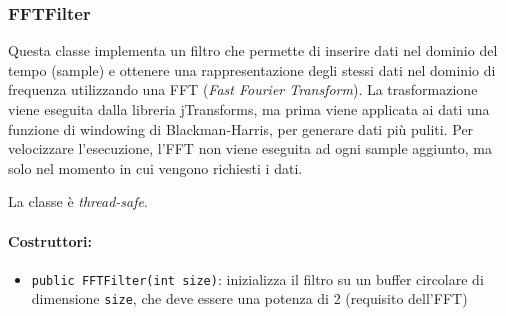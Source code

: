 \subsubsection{FFTFilter}
Questa classe implementa un filtro che permette di inserire dati nel dominio del tempo (sample) e ottenere una rappresentazione degli stessi dati nel dominio di frequenza utilizzando una FFT (\textit{Fast Fourier Transform}). La trasformazione viene eseguita dalla libreria jTransforms, ma prima viene applicata ai dati una funzione di windowing di Blackman-Harris, per generare dati più puliti. Per velocizzare l'esecuzione, l'FFT non viene eseguita ad ogni sample aggiunto, ma solo nel momento in cui vengono richiesti i dati.

La classe è \textit{thread-safe}.

\paragraph{Costruttori:}\begin{itemize}
	\item \texttt{public FFTFilter(int size)}: inizializza il filtro su un buffer circolare di dimensione \texttt{size}, che deve essere una potenza di 2 (requisito dell'FFT)
\end{itemize}

